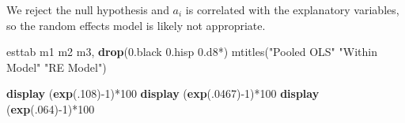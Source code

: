 \documentclass[
]{book}
\newenvironment{Shaded}{\begin{snugshade}}{\end{snugshade}}
\newcommand{\BaseNTok}[1]{\textcolor[rgb]{0.00,0.00,0.81}{#1}}
\newcommand{\FunctionTok}[1]{\textcolor[rgb]{0.13,0.29,0.53}{\textbf{#1}}}
\newcommand{\KeywordTok}[1]{\textcolor[rgb]{0.13,0.29,0.53}{\textbf{#1}}}
\newcommand{\NormalTok}[1]{#1}
\newcommand{\StringTok}[1]{\textcolor[rgb]{0.31,0.60,0.02}{#1}}
\begin{document}
We reject the null hypothesis and \(a_i\) is correlated with the explanatory variables, so the random effects model is likely not appropriate.

\begin{Shaded}
\begin{Highlighting}[]
\NormalTok{esttab m1 m2 m3, }\KeywordTok{drop}\NormalTok{(0.}\BaseNTok{black}\NormalTok{ 0.hisp 0.d8*) mtitles(}\StringTok{"Pooled OLS"} \StringTok{"Within Model"} \StringTok{"RE Model"}\NormalTok{)}

\KeywordTok{display}\NormalTok{ (}\FunctionTok{exp}\NormalTok{(.108){-}1)*100}
\KeywordTok{display}\NormalTok{ (}\FunctionTok{exp}\NormalTok{(.0467){-}1)*100}
\KeywordTok{display}\NormalTok{ (}\FunctionTok{exp}\NormalTok{(.064){-}1)*100}
\end{Highlighting}
\end{Shaded}
\end{document}
